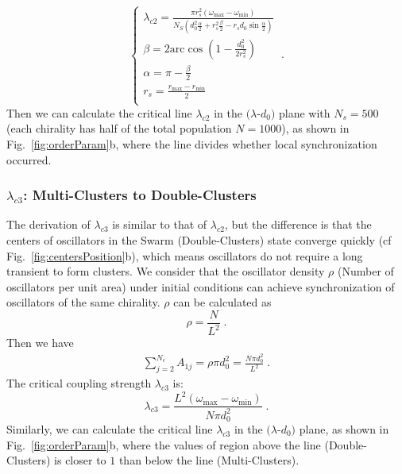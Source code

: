 \documentclass[%
 aip,
 amsmath,amssymb,
 reprint,%
]{revtex4-1}
\begin{document}
\begin{equation}
    \begin{cases}
        \lambda _{c2}=\frac{\pi r_{s}^{2}\left( \omega _{\max}-\omega _{\min} \right)}{N_S\left( d_{0}^{2}\frac{\alpha}{2}+r_{s}^{2}\frac{\beta}{2}-r_sd_0\sin \frac{\alpha}{2} \right)}\\
        \beta =2\mathrm{arc}\cos \left( 1-\frac{d_{0}^{2}}{2r_{s}^{2}} \right)\\
        \alpha =\pi -\frac{\beta}{2}\\
        r_s=\frac{r_{\max}-r_{\min}}{2}\\
    \end{cases}\;.
\end{equation}
Then we can calculate the critical line $\lambda_{c2}$ in the $(\lambda$-$d_0)$ plane with $N_s=500$ (each chirality has half of the total population $N=1000$), as shown in Fig.~\ref{fig:orderParam}b, where the line divides whether local synchronization occurred.

\subsubsection{$\lambda_{c3}$: Multi-Clusters to Double-Clusters}

The derivation of $\lambda_{c3}$ is similar to that of $\lambda_{c2}$, but the difference is that the centers of oscillators in the Swarm (Double-Clusters) state converge quickly (cf Fig.~\ref{fig:centersPosition}b), which means oscillators do not require a long transient to form clusters. We consider that the oscillator density $\rho$ (Number of oscillators per unit area) under initial conditions can achieve synchronization of oscillators of the same chirality. $\rho$ can be calculated as 
\begin{equation}
    \rho =\frac{N}{L^2}\;.
\end{equation}
Then we have 
\begin{eqnarray}
    \sum_{j=2}^{N_c}{A_{1j}}=\rho \pi d_{0}^{2}=\frac{N\pi d_{0}^{2}}{L^2}\;.
\end{eqnarray}
The critical coupling strength $\lambda_{c3}$ is:
\begin{equation}
    \lambda _{c3}=\frac{L^2\left( \omega _{\max}-\omega _{\min} \right)}{N\pi d_{0}^{2}}\;.
\end{equation}
Similarly, we can calculate the critical line $\lambda_{c3}$ in the $(\lambda$-$d_0)$ plane, as shown in Fig.~\ref{fig:orderParam}b, where the values of region above the line (Double-Clusters) is closer to $1$ than below the line (Multi-Clusters).
\end{document}
